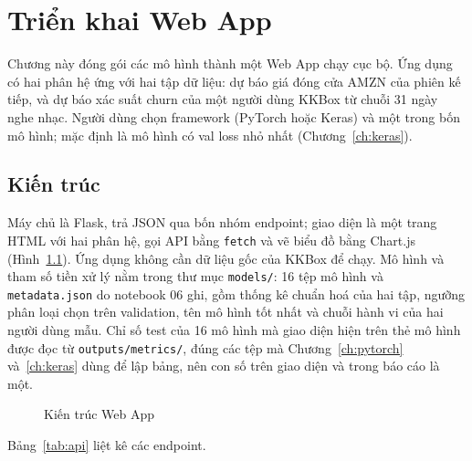 \chapter{Triển khai Web App}
\label{ch:webapp}

Chương này đóng gói các mô hình thành một Web App chạy cục bộ. Ứng dụng có hai phân hệ ứng với hai tập dữ liệu: dự báo
giá đóng cửa AMZN của phiên kế tiếp, và dự báo xác suất churn của một người dùng KKBox từ chuỗi 31 ngày nghe nhạc. Người
dùng chọn framework (PyTorch hoặc Keras) và một trong bốn mô hình; mặc định là mô hình có val loss nhỏ nhất
(Chương~\ref{ch:keras}).

\section{Kiến trúc}

Máy chủ là Flask, trả JSON qua bốn nhóm endpoint; giao diện là một trang HTML với hai phân hệ, gọi API bằng
\texttt{fetch} và vẽ biểu đồ bằng Chart.js (Hình~\ref{fig:arch}). Ứng dụng không cần dữ liệu gốc của KKBox để chạy. Mô
hình và tham số tiền xử lý nằm trong thư mục \texttt{models/}: 16 tệp mô hình và \texttt{metadata.json} do notebook 06
ghi, gồm thống kê chuẩn hoá của hai tập, ngưỡng phân loại chọn trên validation, tên mô hình tốt nhất và chuỗi hành vi của
hai người dùng mẫu. Chỉ số test của 16 mô hình mà giao diện hiện trên thẻ mô hình được đọc từ \texttt{outputs/metrics/},
đúng các tệp mà Chương~\ref{ch:pytorch} và~\ref{ch:keras} dùng để lập bảng, nên con số trên giao diện và trong báo cáo
là một.

\begin{figure}[H]
  \centering
  \caption{Kiến trúc Web App}
  \label{fig:arch}
\end{figure}

Bảng~\ref{tab:api} liệt kê các endpoint.

